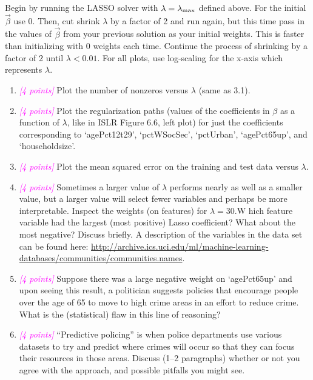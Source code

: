\documentclass{article}
\newcommand{\points}[1]{\small\textcolor{magenta}{\emph{[#1 points]}} \normalsize}
\begin{document}
\vspace{1em}
Begin by running the LASSO solver with
$\lambda = \lambda_{\rm max}$
defined above.  
For the initial $\vec \beta$ use 0.  
Then, cut shrink $\lambda$ by a factor of 2 and run again, 
but this time pass in the values of $\vec \beta$ from your previous solution as 
your initial weights.  
This is faster than initializing with 0 weights each time.  
Continue the process of shrinking by a factor of 2 until $\lambda< 0.01$.
For all plots, use log-scaling for the x-axis which represents $\lambda$.
\begin{enumerate}
\item \points{4} Plot the number of nonzeros versus $\lambda$ (same as 3.1).
\item \points{4} Plot the regularization paths (values of the coefficients in $\beta$
  as a function of $\lambda$, like in ISLR Figure 6.6, left plot) 
  for just the coefficients
  corresponding to `agePct12t29', `pctWSocSec', 
  `pctUrban', `agePct65up', and `householdsize'.
\item \points{4} Plot the mean squared error on the training and test data versus $\lambda$.
\item \points{4} Sometimes a larger value of $\lambda$ performs nearly as well 
  as a smaller value, but a larger value will select fewer variables 
  and perhaps be more interpretable.  
  Inspect the weights (on features) for $\lambda= 30$.W
  hich feature variable had the largest (most positive) Lasso coefficient?  
  What about the most negative?
  Discuss briefly.  
  A description of the variables in the data set can be found here:
  \url{http://archive.ics.uci.edu/ml/machine-learning-databases/communities/communities.names}.
\item \points{4} Suppose there was a large negative weight on `agePct65up'
  and upon seeing this result, a politician suggests policies that encourage 
  people over the age of 65 to move to high crime areas in an effort to reduce crime.
  What is the (statistical) flaw in this line of reasoning?
\item \points{4} ``Predictive policing'' is when police departments use various
  datasets to try and predict where crimes will occur so that they can focus their
  resources in those areas. Discuss (1--2 paragraphs) whether or not you
  agree with the approach, and possible pitfalls you might see.
\end{enumerate}
\end{document}
